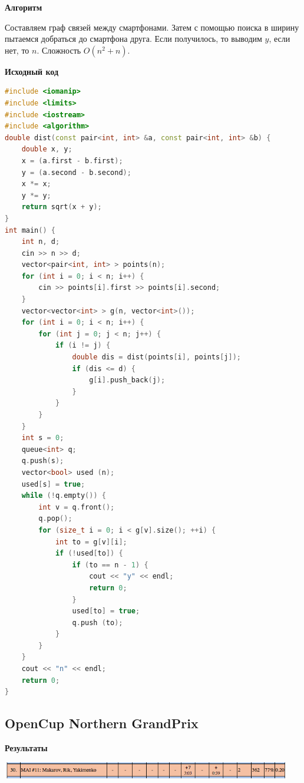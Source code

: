 \documentclass[a4paper,12pt]{article}
\begin{document}
\textbf{{\large Алгоритм}}

Составляем граф связей между смартфонами. Затем с помощью поиска в ширину пытаемся добраться до смартфона друга. Если получилось, то выводим $y$, если нет, то $n$. Сложность $O(n^2+n)$.

\newpage
\textbf{{\large Исходный код}} \\
\begin{lstlisting}[language=C++]
#include <iomanip>
#include <limits>
#include <iostream>
#include <algorithm>
double dist(const pair<int, int> &a, const pair<int, int> &b) {
    double x, y;
    x = (a.first - b.first);
    y = (a.second - b.second);
    x *= x;
    y *= y;
    return sqrt(x + y);
}
int main() {
    int n, d;
    cin >> n >> d;
    vector<pair<int, int> > points(n);
    for (int i = 0; i < n; i++) {
        cin >> points[i].first >> points[i].second;
    }
    vector<vector<int> > g(n, vector<int>());
    for (int i = 0; i < n; i++) {
        for (int j = 0; j < n; j++) {
            if (i != j) {
                double dis = dist(points[i], points[j]);
                if (dis <= d) {
                    g[i].push_back(j);
                }
            }
        }
    }
    int s = 0;
    queue<int> q;
    q.push(s);
    vector<bool> used (n);
    used[s] = true;
    while (!q.empty()) {
        int v = q.front();
        q.pop();
        for (size_t i = 0; i < g[v].size(); ++i) {
            int to = g[v][i];
            if (!used[to]) {
                if (to == n - 1) {
                    cout << "y" << endl;
                    return 0;
                }
                used[to] = true;
                q.push (to);
            }
        }
    }
    cout << "n" << endl;
    return 0;
}
\end{lstlisting}





%
%
\newpage
\subsection{OpenCup Northern GrandPrix}

\textbf{{\large Результаты}} \\
\begin{center}
\includegraphics[width=0.95\textwidth]{OC_Northern/OC_Northern_result.png}\\ [1cm]
\end{center}
\end{document}
